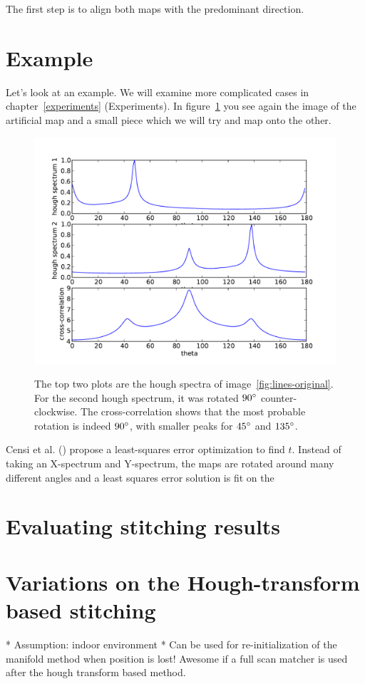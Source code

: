 The first step is to align both maps with the predominant direction. 

\section{Example}
Let's look at an example. We will examine more complicated cases in chapter~\ref{experiments} (Experiments). In figure~\ref{fig:room-partial} you see again the image of the artificial map and a small piece which we will try and map onto the other. 

\begin{figure}[ht]
	\centering
	\includegraphics[width=\textwidth]{images/stitching/lines-cross-correlation.pdf}
	\label{fig:room-partial}
	\caption{The top two plots are the hough spectra of image~\ref{fig:lines-original}. For the second hough spectrum, it was rotated $90\degree$ counter-clockwise. The cross-correlation shows that the most probable rotation is indeed $90\degree$, with smaller peaks for $45\degree$ and $135\degree$.}
\end{figure}

Censi et al. (\cite{censi2005scan}) propose a least-squares error optimization to find $\hat t$. Instead of taking an X-spectrum and Y-spectrum, the maps are rotated around many different angles and a least squares error solution is fit on the 

\section{Evaluating stitching results}

\section{Variations on the Hough-transform based stitching}

* Assumption: indoor environment
* Can be used for re-initialization of the manifold method when position is lost! Awesome if a full scan matcher is used after the hough transform based method.